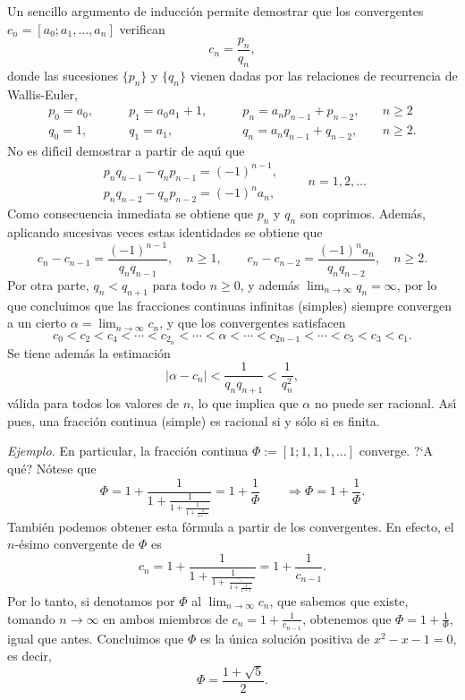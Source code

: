 Un sencillo argumento de inducci\'on permite demostrar que los convergentes
$c_n=[a_0;a_1,\dots,a_n]$ verifican
$$
c_n=\frac{p_n}{q_n},
$$
donde las sucesiones $\{p_n\}$ y $\{q_n\}$ vienen dadas por las relaciones de
recurrencia de Wallis-Euler, 
$$
\begin{array}{llll}
p_0=a_0,\qquad& p_1=a_0a_1+1,\qquad &p_n=a_np_{n-1}+p_{n-2},\quad &n\ge 2\\
q_0=1,\qquad& q_1=a_1,\qquad &q_n=a_nq_{n-1}+q_{n-2},\quad &n\ge 2.
\end{array}
$$
No es dif\'{\i}cil demostrar a partir de aqu\'{\i} que
$$
\begin{array}{l}
p_nq_{n-1}-q_np_{n-1}=(-1)^{n-1},\\
p_nq_{n-2}-q_np_{n-2}=(-1)^{n}a_n,
\end{array}
 \qquad n=1,2,\dots
$$
Como consecuencia inmediata se obtiene que $p_n$ y $q_n$ son coprimos. Adem\'as,
aplicando sucesivas veces estas identidades se obtiene que
$$
c_n-c_{n-1}=\frac{(-1)^{n-1}}{q_nq_{n-1}},\quad n\ge 1,\qquad
c_{n}-c_{n-2}=\frac{(-1)^n a_n}{q_nq_{n-2}},\quad n\ge2.
$$
Por otra parte, $q_n<q_{n+1}$ para todo $n\ge0$, y adem\'as
$\lim_{n\to\infty}q_n=\infty$, por lo que concluimos que las fracciones
continuas infinitas (simples) siempre convergen a un cierto
$\alpha=\lim_{n\to\infty}c_n$, y que los convergentes satisfacen
$$
c_0<c_2<c_4<\cdots<c_{2_n}<\cdots<\alpha<\cdots<c_{2n-1}<\cdots<c_5<c_3<c_1.
$$
Se tiene adem\'as la estimaci\'on
$$
\left|\alpha-c_n\right|<\frac1{q_nq_{n+1}}<\frac1{q_{n}^2},
$$
v\'alida para todos los valores de $n$, lo que implica que $\alpha$ no puede ser
racional.
As\'{\i} pues, una fracci\'on continua (simple) es racional si y s\'olo si es
finita.

\noindent\emph{Ejemplo. } En particular, la fracci\'on continua
$\Phi:=[1;1,1,1,\dots]$ converge. ?`A qu\'e? N\'otese que
$$
\Phi=1+\frac1{1+\displaystyle\frac1{1+\displaystyle\frac1{1+\displaystyle\frac1{
1+\ddots}}}}=1+\frac1\Phi\qquad\Rightarrow \Phi=1+\frac1\Phi.
$$
Tambi\'en podemos obtener esta f\'ormula a partir de los convergentes. En
efecto, el $n$-\'esimo convergente de $\Phi$ es 
$$
c_n=1+\frac1{1+\displaystyle\frac1{1+\displaystyle\frac\ddots{
1+\displaystyle\frac1{1+1}}}}=1+\frac1{c_{n-1}}.
$$
Por lo tanto, si denotamos por $\Phi$ al $\lim_{n\to\infty}c_n$, que sabemos que
existe, tomando $n\to\infty$ en ambos miembros de $c_n=1+\frac{1}{c_{n-1}}$,
obtenemos que $\Phi=1+\frac1\Phi$, igual que antes. Concluimos que $\Phi$ es la
\'unica soluci\'on positiva de $x^2-x-1=0$, es decir,
$$
\Phi=\frac{1+\sqrt{5}}2.
$$ 


